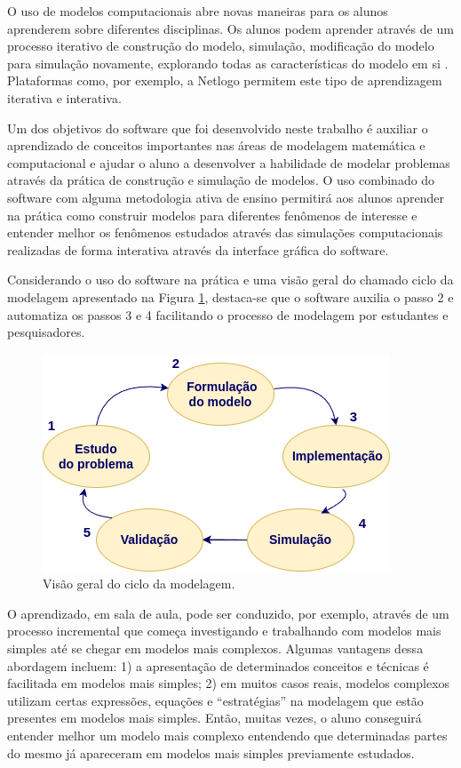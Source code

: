 \documentclass[
	12pt,				%
	openright,			%
	oneside,			%
	a4paper,			%
	main=brazil,
	english,			%
	]{ufsj-abntex2}
\begin{document}
O uso de modelos computacionais abre novas maneiras para os alunos aprenderem sobre diferentes disciplinas. Os alunos podem aprender através de um processo iterativo de construção do modelo, simulação, modificação do modelo para simulação novamente, explorando todas as características do modelo em si \cite{Eleonora2022}. Plataformas como, por exemplo, a Netlogo \cite{Netlogo2015} permitem este tipo de aprendizagem iterativa e interativa.

Um dos objetivos do software que foi desenvolvido neste trabalho é auxiliar o aprendizado de conceitos importantes nas áreas de modelagem matemática e computacional e ajudar o aluno a desenvolver a habilidade de modelar problemas através da prática de construção e simulação de modelos. O uso combinado do software com alguma metodologia ativa de ensino permitirá aos alunos aprender na prática como construir modelos para diferentes fenômenos de interesse e entender melhor os fenômenos estudados através das simulações computacionais realizadas de forma interativa através da interface gráfica do software. 

Considerando o uso do software na prática e uma visão geral do chamado ciclo da modelagem apresentado na Figura \ref{fig:ciclo-modelagem}, destaca-se que o software auxilia o passo 2 e automatiza os passos 3 e 4 facilitando o processo de modelagem por estudantes e pesquisadores. 

\begin{figure}[h]
    \centering
    \includegraphics[scale=0.5]{imgs/ciclo-modelagem.png} 
    \caption{Visão geral do ciclo da modelagem.}
    \label{fig:ciclo-modelagem}
\end{figure}

O aprendizado, em sala de aula, pode ser conduzido, por exemplo, através de um processo incremental que começa investigando e trabalhando com modelos mais simples até se chegar em modelos mais complexos. Algumas vantagens dessa abordagem incluem:  1) a apresentação de determinados conceitos e técnicas é facilitada em modelos mais simples; 2) em muitos casos reais, modelos complexos utilizam certas expressões, equações e “estratégias” na modelagem que estão presentes em modelos mais simples. Então, muitas vezes, o aluno conseguirá entender melhor um modelo mais complexo entendendo que determinadas partes do mesmo já apareceram em modelos mais simples previamente estudados. 
\end{document}

